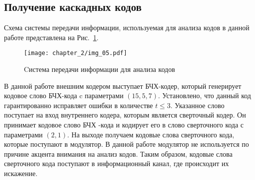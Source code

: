 \subsection{Получение каскадных кодов}
Схема системы передачи информации, используемая для анализа кодов в данной работе представлена на
Рис.~\ref{img_05}.

\begin{figure}[htbp]
\begin{center}
\texttt{[image: chapter\_2/img\_05.pdf]}
\end{center}
\caption{Cистема передачи информации для анализа кодов}
\label{img_05}
\end{figure}

В данной работе внешним кодером выступает БЧХ-кодер, который генерирует кодовое слово БЧХ-кода c параметрами 
$(15, 5, 7 )$. Установлено, что данный код гарантированно исправляет ошибки в количестве $t\le3$. Указанное 
слово поступает на вход внутреннего кодера, которым является сверточный кодер. Он принимает кодовое слово БЧХ
-кода и кодирует его в слово сверточного кода с параметрами $(2, 1)$. На выходе получаем кодовые слова 
сверточного кода, которые поступают в модулятор. В данной работе модулятор не используется по причине 
акцента внимания на анализ кодов. Таким образом, кодовые слова сверточного кода поступают в информационный 
канал, где происходит их искажение.

